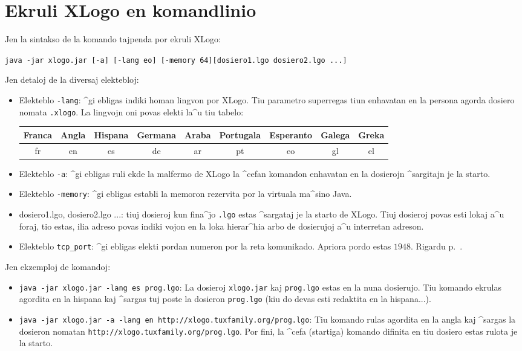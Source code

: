 \chapter{Ekruli XLogo en komandlinio}

Jen la sintakso de la komando tajpenda por ekruli XLogo:
\begin{center}
  \texttt{java -jar xlogo.jar [-a] [-lang eo] [-memory
    64][dosiero1.lgo dosiero2.lgo ...] }
\end{center}
Jen detaloj de la diversaj elektebloj:
\begin{itemize}
\item Elekteblo \texttt{-lang}: ^gi ebligas indiki homan lingvon por
  XLogo.  Tiu parametro superregas tiun enhavatan en la persona agorda
  dosiero nomata \texttt{.xlogo}.  La lingvojn oni povas elekti la^u
  tiu tabelo:
  \begin{center}
    \begin{tabular}{|c|c|c|c|c|c|c|c|c|}
      \hline
      Franca & Angla & Hispana & Germana & Araba & Portugala & Esperanto & Galega & Greka \\
      \hline
      fr & en & es & de & ar & pt & eo & gl & el \\
      \hline
    \end{tabular}
  \end{center}
  \vspace{0.5cm}
\item Elekteblo \texttt{-a}: ^gi ebligas ruli ekde la malfermo de
  XLogo la ^cefan komandon enhavatan en la dosierojn ^sargitajn je la
  starto.
\item Elekteblo \texttt{-memory}: ^gi ebligas establi la memoron
  rezervita por la virtuala ma^sino Java.
\item dosiero1.lgo, dosiero2.lgo ...: tiuj dosieroj kun fina^jo
  \texttt{.lgo} estas ^sargataj je la starto de XLogo.  Tiuj dosieroj
  povas esti lokaj a^u foraj, tio estas, ilia adreso povas indiki
  vojon en la loka hierar^hia arbo de dosierujoj a^u interretan
  adreson.
\item Elekteblo \texttt{tcp\_port}: ^gi ebligas elekti pordan numeron
  por la reta komunikado.  Apriora pordo estas $1948$.  Rigardu
  p.~\pageref{reseau}.
\end{itemize}
\vspace{0.5cm}
Jen ekzemploj de komandoj:
\begin{itemize}
\item \texttt{java -jar xlogo.jar -lang es prog.lgo}: La dosieroj
  \texttt{xlogo.jar} kaj \texttt{prog.lgo} estas en la nuna dosierujo.
  Tiu komando ekrulas \xlogo{} agordita en la hispana kaj ^sargas tuj
  poste la dosieron \texttt{prog.lgo} (kiu do devas esti redaktita en
  la hispana...).
\item \texttt{java -jar xlogo.jar -a -lang en
    http://xlogo.tuxfamily.org/prog.lgo}: Tiu komando rulas \xlogo{}
  agordita en la angla kaj ^sargas la dosieron nomatan
  \texttt{http://xlogo.tuxfamily.org/prog.lgo}.  Por fini, la ^cefa
  (startiga) komando difinita en tiu dosiero estas rulota je la
  starto.
\end{itemize}


